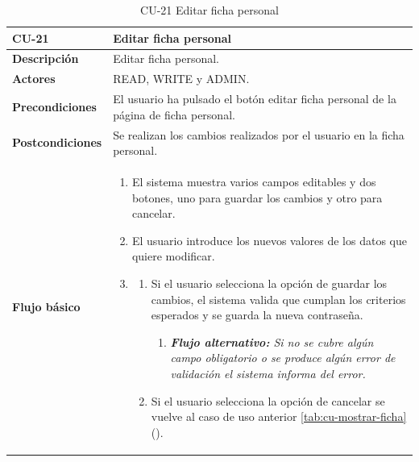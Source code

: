\begin{table} [H]
    \centering
    \setlength{\leftmargini}{0.4cm}
	\resizebox{15cm}{!} { %
    \begin{tabular}{| m{3cm} | m{12cm} |}   
    \hline
	  \textbf{CU-21} & \textbf{Editar ficha personal} \\\hline
	  \textbf{Descripción} & Editar ficha personal. \\\hline
	  \textbf{Actores} & READ, WRITE y ADMIN. \\\hline
	  \textbf{Precondiciones} & El usuario ha pulsado el botón editar ficha personal de la página de ficha personal. \\\hline
	  \textbf{Postcondiciones} & Se realizan los cambios realizados por el usuario en la ficha personal. \\\hline
	  \textbf{Flujo básico} & 
		\begin{enumerate}
	  	\item El sistema muestra varios campos editables y dos botones, uno para guardar los cambios y otro para cancelar.
		\item El usuario introduce los nuevos valores de los datos que quiere modificar.
		\item 
		\begin{enumerate}		
			\item Si el usuario selecciona la opción de guardar los cambios, el sistema valida que cumplan los criterios esperados y se guarda la nueva contraseña.
			\begin{enumerate}	
			   \item \textit{\textbf{Flujo alternativo:} Si no se cubre algún campo obligatorio o se produce algún error de validación el sistema informa del error.}		   
			\end{enumerate}
			\item Si el usuario selecciona la opción de cancelar se vuelve al caso de uso anterior \ref{tab:cu-mostrar-ficha} (\pageref{tab:cu-mostrar-ficha}).
		\end{enumerate}
	  \end{enumerate} 	  	  
	  \\\hline
    \end{tabular}
    } %
    \caption{CU-21 Editar ficha personal}
    \label{tab:cu-editar-ficha}
\end{table}



